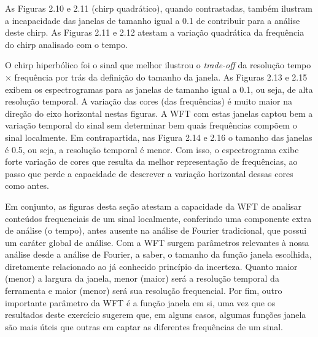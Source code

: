 As Figuras 2.10 e 2.11 (chirp quadrático), quando contrastadas, também ilustram a incapacidade das janelas de tamanho igual a 0.1 de contribuir para a análise deste chirp. As Figuras 2.11 e 2.12 atestam a variação quadrática da frequência do chirp analisado com o tempo.

O chirp hiperbólico foi o sinal que melhor ilustrou o \textit{trade-off} da resolução tempo $\times$ frequência por trás da definição do tamanho da janela. As Figuras 2.13 e 2.15 exibem os espectrogramas para as janelas de tamanho igual a 0.1, ou seja, de alta resolução temporal. A variação das cores (das frequências) é muito maior na direção do eixo horizontal nestas figuras. A WFT com estas janelas captou bem a variação temporal do sinal sem determinar bem quais frequências compõem o sinal localmente. Em contrapartida, nas Figura 2.14 e 2.16 o tamanho das janelas é 0.5, ou seja, a resolução temporal é menor. Com isso, o espectrograma exibe forte variação de cores que resulta da melhor representação de frequências, ao passo que perde a capacidade de descrever a variação horizontal dessas cores como antes. 

Em conjunto, as figuras desta seção atestam a capacidade da WFT de analisar conteúdos frequenciais de um sinal localmente, conferindo uma componente extra de análise (o tempo), antes ausente na análise de Fourier tradicional, que possui um caráter global de análise. Com a WFT surgem parâmetros relevantes à nossa análise desde a análise de Fourier, a saber, o tamanho da função janela escolhida, diretamente relacionado ao já conhecido princípio da incerteza. Quanto maior (menor) a largura da janela, menor (maior) será a resolução temporal da ferramenta e maior (menor) será sua resolução frequencial. Por fim, outro importante parâmetro da WFT é a função janela em si, uma vez que os resultados deste exercício sugerem que, em alguns casos, algumas funções janela são mais úteis que outras em captar as diferentes frequências de um sinal.
















